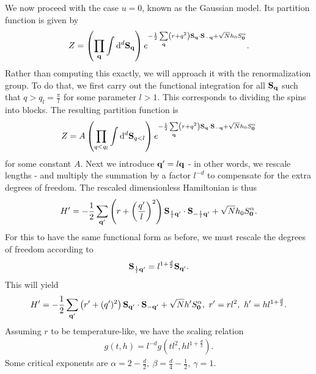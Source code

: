 We now proceed with the case $u = 0$, known as the Gaussian model. Its partition function is given by
\begin{align*}
	Z = \left(\prod\limits_{\vb{q}}\int\limits_{}^{}\dd[d]{\vb{S}_{\vb{q}}}\right)e^{-\frac{1}{2}\sum\limits_{\vb{q}}\left(r + q^{2}\right)\vb{S}_{\vb{q}}\cdot\vb{S}_{-\vb{q}} + \sqrt{N}h_{0}S_{\vb{0}}^{\alpha}}.
\end{align*}
Rather than computing this exactly, we will approach it with the renormalization group. To do that, we first carry out the functional integration for all $\vb{S}_{\vb{q}}$ such that $q > q_{l} = \frac{\pi}{l}$ for some parameter $l > 1$. This corresponds to dividing the spins into blocks. The resulting partition function is
\begin{align*}
	Z = A\left(\prod\limits_{q < q_{l}}\int\limits_{}^{}\dd[d]{\vb{S}_{q < l}}\right)e^{-\frac{1}{2}\sum\limits_{\vb{q}}\left(r + q^{2}\right)\vb{S}_{\vb{q}}\cdot\vb{S}_{-\vb{q}} + \sqrt{N}h_{0}S_{\vb{0}}^{\alpha}}
\end{align*}
for some constant $A$. Next we introduce $\vb{q}^{\prime} = l\vb{q}$ - in other words, we rescale lengths - and multiply the summation by a factor $l^{-d}$ to compensate for the extra degrees of freedom. The rescaled dimensionless Hamiltonian is thus
\begin{align*}
	H^{\prime} = -\frac{1}{2}\sum\limits_{\vb{q}^{\prime}}\left(r + \left(\frac{q^{\prime}}{l}\right)^{2}\right)\vb{S}_{\frac{1}{l}\vb{q}^{\prime}}\cdot\vb{S}_{-\frac{1}{l}\vb{q}^{\prime}} + \sqrt{N}h_{0}S_{\vb{0}}^{\alpha}.
\end{align*}
For this to have the same functional form as before, we must rescale the degrees of freedom according to
\begin{align*}
	\vb{S}_{\frac{1}{l}\vb{q}^{\prime}} = l^{1 + \frac{d}{2}}\vb{S}_{\vb{q}^{\prime}}.
\end{align*}
This will yield
\begin{align*}
	H^{\prime} = -\frac{1}{2}\sum\limits_{\vb{q}^{\prime}}\left(r^{\prime} + (q^{\prime})^{2}\right)\vb{S}_{\vb{q}^{\prime}}\cdot\vb{S}_{-\vb{q}^{\prime}} + \sqrt{N}h^{\prime}S_{\vb{0}}^{\alpha},\ r^{\prime} = rl^{2},\ h^{\prime} = hl^{1 + \frac{d}{2}}.
\end{align*}
Assuming $r$ to be temperature-like, we have the scaling relation
\begin{align*}
	g(t, h) = l^{-d}g(tl^{2}, hl^{1 + \frac{d}{2}}).
\end{align*}
Some critical exponents are $\alpha = 2 - \frac{d}{2},\ \beta = \frac{d}{4} - \frac{1}{2},\ \gamma = 1$.

